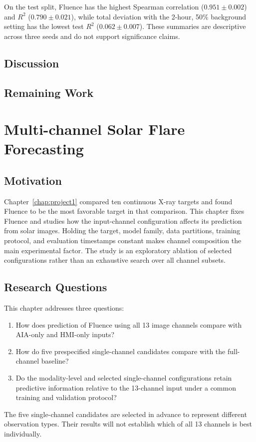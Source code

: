 \documentclass[12pt]{report}
\begin{document}
On the test split, Fluence has the highest Spearman correlation ($0.951\pm0.002$) and $R^2$ ($0.790\pm0.021$), while total deviation with the 2-hour, 50\% background setting has the lowest test $R^2$ ($0.062\pm0.007$). These summaries are descriptive across three seeds and do not support significance claims.

\section{Discussion}

\section{Remaining Work}

\chapter{Multi-channel Solar Flare Forecasting}
\label{chap:project2}

\section{Motivation}

Chapter~\ref{chap:project1} compared ten continuous X-ray targets and found Fluence to be the most favorable target in that comparison. This chapter fixes Fluence and studies how the input-channel configuration affects its prediction from solar images. Holding the target, model family, data partitions, training protocol, and evaluation timestamps constant makes channel composition the main experimental factor. The study is an exploratory ablation of selected configurations rather than an exhaustive search over all channel subsets.

\section{Research Questions}

This chapter addresses three questions:
\begin{enumerate}
    \item How does prediction of Fluence using all 13 image channels compare with AIA-only and HMI-only inputs?
    \item How do five prespecified single-channel candidates compare with the full-channel baseline?
    \item Do the modality-level and selected single-channel configurations retain predictive information relative to the 13-channel input under a common training and validation protocol?
\end{enumerate}
The five single-channel candidates are selected in advance to represent different observation types. Their results will not establish which of all 13 channels is best individually.
\end{document}
